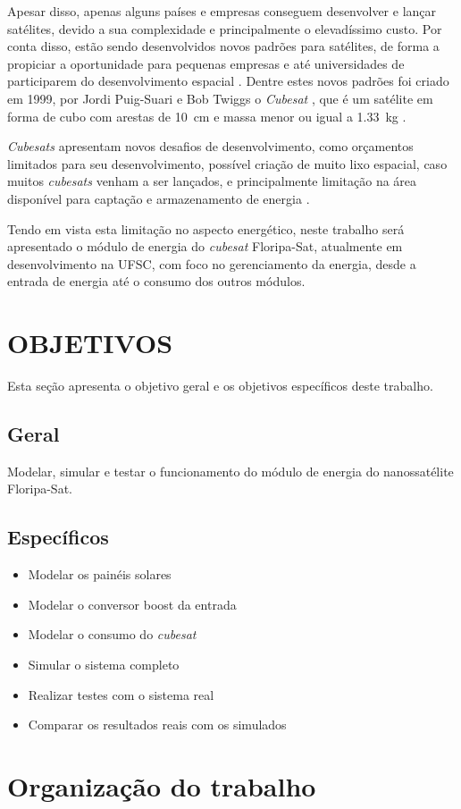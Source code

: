 Apesar disso, apenas alguns países e empresas conseguem desenvolver e lançar satélites, devido a sua complexidade e principalmente o elevadíssimo custo. Por conta disso, estão sendo desenvolvidos novos padrões para satélites, de forma a propiciar a oportunidade para pequenas empresas e até universidades de participarem do desenvolvimento espacial \cite{largeBenefitsOfSmallSatellites}. Dentre estes novos padrões foi criado em 1999, por Jordi Puig-Suari e Bob Twiggs o \textit{Cubesat} \cite{cubesatCreation}, que é um satélite em forma de cubo com arestas de \SI{10}{\centi\metre} e massa menor ou igual a \SI{1.33}{\kilo\gram} \cite{cubesatDesignSpecification}.

\textit{Cubesats} apresentam novos desafios de desenvolvimento, como orçamentos limitados para seu desenvolvimento, possível criação de muito lixo espacial, caso muitos \textit{cubesats} venham a ser lançados, e principalmente limitação na área disponível para captação e armazenamento de energia \cite{nanosatelliteDevelopment}.

Tendo em vista esta limitação no aspecto energético, neste trabalho será apresentado o módulo de energia do \textit{cubesat} Floripa-Sat, atualmente em desenvolvimento na UFSC, com foco no gerenciamento da energia, desde a entrada de energia até o consumo dos outros módulos.

\section{OBJETIVOS}

Esta seção apresenta o objetivo geral e os objetivos específicos deste trabalho.

\subsection{Geral}

Modelar, simular e testar o funcionamento do módulo de energia do nanossatélite Floripa-Sat.

\subsection{Específicos}
\begin{itemize}
\item Modelar os painéis solares
\item Modelar o conversor boost da entrada
\item Modelar o consumo do \textit{cubesat}
\item Simular o sistema completo
\item Realizar testes com o sistema real
\item Comparar os resultados reais com os simulados
\end{itemize}

\section{Organização do trabalho}